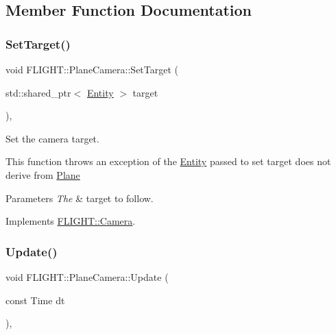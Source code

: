 \subsection{Member Function Documentation}
\mbox{\label{class_f_l_i_g_h_t_1_1_plane_camera_a2015a019a4008c3e7f8080df34d115b3}} 
\subsubsection{\texorpdfstring{Set\+Target()}{SetTarget()}}
{\footnotesize\ttfamily void F\+L\+I\+G\+H\+T\+::\+Plane\+Camera\+::\+Set\+Target (\begin{DoxyParamCaption}\item[{std\+::shared\+\_\+ptr$<$ \hyperlink{class_f_l_i_g_h_t_1_1_entity}{Entity} $>$}]{target }\end{DoxyParamCaption})\hspace{0.3cm}{\ttfamily [override]}, {\ttfamily [virtual]}}



Set the camera target. 

This function throws an exception of the \hyperlink{class_f_l_i_g_h_t_1_1_entity}{Entity} passed to set target does not derive from \hyperlink{class_f_l_i_g_h_t_1_1_plane}{Plane} 
\begin{DoxyParams}{Parameters}
{\em The} & target to follow. \\
\hline
\end{DoxyParams}


Implements \hyperlink{class_f_l_i_g_h_t_1_1_camera_a9141e385388725340f06982d5f606396}{F\+L\+I\+G\+H\+T\+::\+Camera}.

\mbox{\label{class_f_l_i_g_h_t_1_1_plane_camera_a806e8a07ea8fad7aee17de4fbbf075c5}} 
\subsubsection{\texorpdfstring{Update()}{Update()}}
{\footnotesize\ttfamily void F\+L\+I\+G\+H\+T\+::\+Plane\+Camera\+::\+Update (\begin{DoxyParamCaption}\item[{const Time}]{dt }\end{DoxyParamCaption})\hspace{0.3cm}{\ttfamily [override]}, {\ttfamily [virtual]}}



